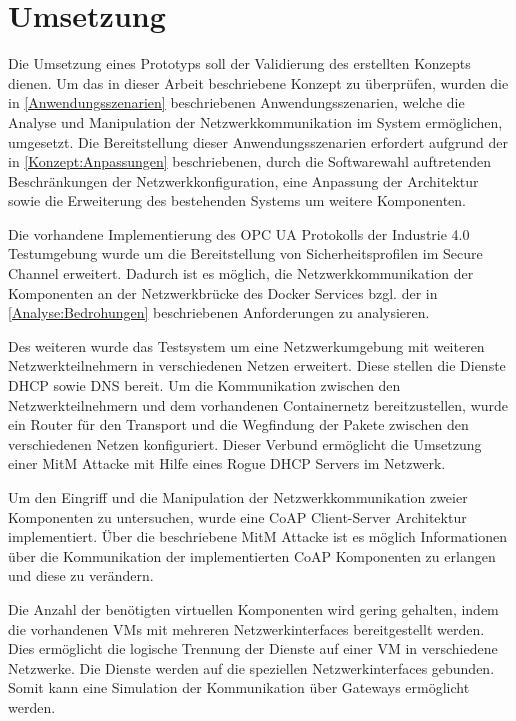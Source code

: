\chapter{Umsetzung}
\label{Umsetzung}
Die Umsetzung eines Prototyps soll der Validierung des erstellten Konzepts dienen. Um das in dieser Arbeit beschriebene Konzept zu überprüfen, wurden die in \autoref{Anwendungsszenarien} beschriebenen Anwendungsszenarien, welche die Analyse und Manipulation der Netzwerkkommunikation im System ermöglichen, umgesetzt. Die Bereitstellung dieser Anwendungsszenarien erfordert aufgrund der in \autoref{Konzept:Anpassungen} beschriebenen, durch die Softwarewahl auftretenden Beschränkungen der Netzwerkkonfiguration, eine Anpassung der Architektur sowie die Erweiterung des bestehenden Systems um weitere Komponenten.

Die vorhandene Implementierung des \ac{OPC UA} Protokolls der Industrie 4.0 Testumgebung wurde um die Bereitstellung von Sicherheitsprofilen im Secure Channel erweitert. Dadurch ist es möglich, die Netzwerkkommunikation der Komponenten an der Netzwerkbrücke des Docker Services bzgl. der in \autoref{Analyse:Bedrohungen} beschriebenen Anforderungen zu analysieren. 

Des weiteren wurde das Testsystem um eine Netzwerkumgebung mit weiteren Netzwerkteilnehmern in verschiedenen Netzen erweitert. Diese stellen die Dienste DHCP sowie DNS bereit. Um die Kommunikation zwischen den Netzwerkteilnehmern und dem vorhandenen Containernetz bereitzustellen, wurde ein Router für den Transport und die Wegfindung der Pakete zwischen den verschiedenen Netzen konfiguriert. Dieser Verbund ermöglicht die Umsetzung einer \ac{MitM} Attacke mit Hilfe eines Rogue \ac{DHCP} Servers im Netzwerk.

Um den Eingriff und die Manipulation der Netzwerkkommunikation zweier Komponenten zu untersuchen, wurde eine \ac{CoAP} Client-Server Architektur implementiert. Über die beschriebene \ac{MitM} Attacke ist es möglich Informationen über die Kommunikation der implementierten \ac{CoAP} Komponenten zu erlangen und diese zu verändern.

Die Anzahl der benötigten virtuellen Komponenten wird gering gehalten, indem die vorhandenen \ac{VM}s mit mehreren Netzwerkinterfaces bereitgestellt werden. Dies ermöglicht die logische Trennung der Dienste auf einer \ac{VM} in verschiedene Netzwerke. Die Dienste werden auf die speziellen Netzwerkinterfaces gebunden. Somit kann eine Simulation der Kommunikation über Gateways ermöglicht werden.

